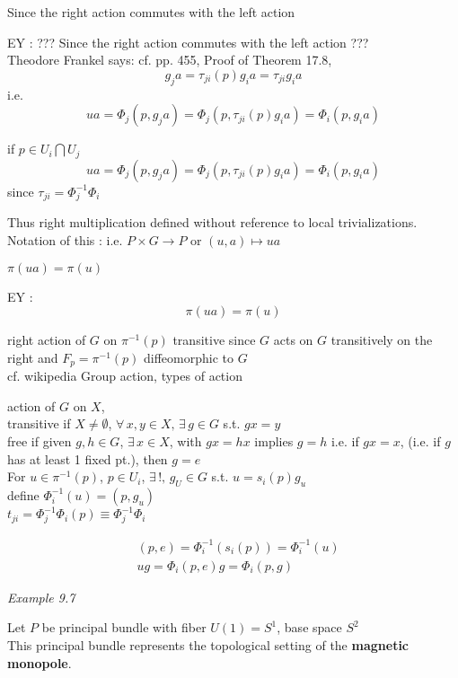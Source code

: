 \documentclass[twoside]{amsart}
\begin{document}
Since the right action commutes with the left action  

EY : ??? Since the right action commutes with the left action   ??? \\
Theodore Frankel says: cf. pp. 455, Proof of Theorem 17.8, 
\[
g_ja = \tau_{ji}(p)g_i a = \tau_{ji} g_i a 
\]
i.e.
\[
ua = \Phi_j(p, g_ja) = \Phi_j(p,\tau_{ji}(p)g_ia ) = \Phi_i(p, g_ia)
\]



if $p \in U_i \bigcap U_j$
\[
ua = \Phi_j(p,g_j a) = \Phi_j(p, \tau_{ji}(p) g_i a) = \Phi_i(p,g_i a)
\]
since $\tau_{ji} = \Phi_j^{-1} \Phi_i$

Thus right multiplication defined without reference to local trivializations.  Notation of this : i.e. $P\times G \to P$ or $(u,a) \mapsto ua$




$\pi(ua) = \pi(u)$

EY : 
\[
\boxed{ \pi(ua) = \pi(u) }
\]

right action of $G$ on $\pi^{-1}(p)$ transitive since $G$ acts on $G$ transitively on the right and $F_p = \pi^{-1}(p)$ diffeomorphic to $G$ \\

cf. wikipedia Group action, types of action

action of $G$ on $X$, \\
transitive if $X \neq \emptyset $, $\forall \, x , y \in X, \, \exists \, g \in G$ s.t. $gx = y$ \\
free if given $g,h\in G$, $\exists \, x \in X$, with $gx  = hx$ implies $g=h$ i.e. if $gx = x$, (i.e. if $g$ has at least 1 fixed pt.), then $g=e$ \\

For $u \in \pi^{-1}(p)$, $p \in U_i$, $\exists \, !, \, g_U \in G$ s.t. $u = s_i(p)g_u$ \\
define $\Phi_i^{-1}(u) = (p, g_u)$   \\

$t_{ji} = \Phi_j^{-1}\Phi_i(p) \equiv \Phi_j^{-1} \Phi_i$

\[
\begin{aligned}
  & (p,e) = \Phi_i^{-1}(s_i(p)) = \Phi_i^{-1}(u) \\ 
  &  ug = \Phi_i(p,e)g = \Phi_i(p,g)
\end{aligned}
\]



\emph{Example 9.7}

Let $P$ be principal bundle with fiber $U(1) = S^1$, base space $S^2$ \\
This principal bundle represents the topological setting of the \textbf{magnetic monopole}.   \\
\end{document}
